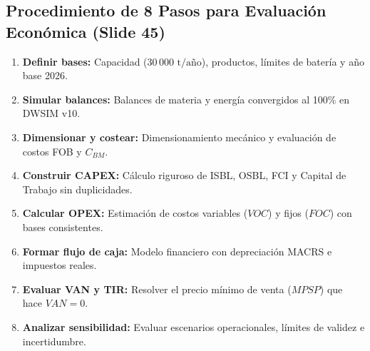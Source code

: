 \documentclass[11pt,letterpaper]{article}
\begin{document}
\subsection{Procedimiento de 8 Pasos para Evaluación Económica (Slide 45)}
\begin{enumerate}
    \item \textbf{Definir bases:} Capacidad ($30\,000\text{ t/año}$), productos, límites de batería y año base 2026.
    \item \textbf{Simular balances:} Balances de materia y energía convergidos al 100\% en DWSIM v10.
    \item \textbf{Dimensionar y costear:} Dimensionamiento mecánico y evaluación de costos FOB y $C_{BM}$.
    \item \textbf{Construir CAPEX:} Cálculo riguroso de ISBL, OSBL, FCI y Capital de Trabajo sin duplicidades.
    \item \textbf{Calcular OPEX:} Estimación de costos variables ($VOC$) y fijos ($FOC$) con bases consistentes.
    \item \textbf{Formar flujo de caja:} Modelo financiero con depreciación MACRS e impuestos reales.
    \item \textbf{Evaluar VAN y TIR:} Resolver el precio mínimo de venta ($MPSP$) que hace $VAN = 0$.
    \item \textbf{Analizar sensibilidad:} Evaluar escenarios operacionales, límites de validez e incertidumbre.
\end{enumerate}
\end{document}
